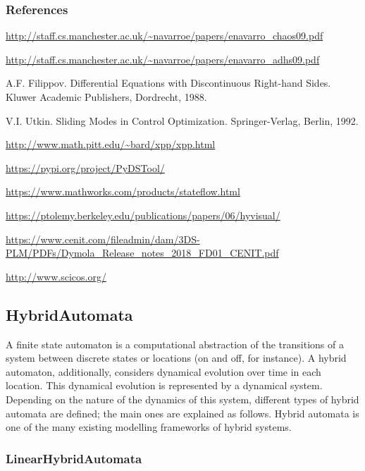 \subsubsection{References}

\url{http://staff.cs.manchester.ac.uk/~navarroe/papers/enavarro_chaos09.pdf}

\url{http://staff.cs.manchester.ac.uk/~navarroe/papers/enavarro_adhs09.pdf}

A.F. Filippov. Differential Equations with Discontinuous Right-hand Sides. Kluwer Academic Publishers, Dordrecht, 1988.

V.I. Utkin. Sliding Modes in Control Optimization. Springer-Verlag, Berlin, 1992.

\url{http://www.math.pitt.edu/~bard/xpp/xpp.html}

\url{https://pypi.org/project/PyDSTool/}

\url{https://www.mathworks.com/products/stateflow.html}

\url{https://ptolemy.berkeley.edu/publications/papers/06/hyvisual/}

\url{https://www.cenit.com/fileadmin/dam/3DS-PLM/PDFs/Dymola_Release_notes_2018_FD01_CENIT.pdf}

\url{http://www.scicos.org/}


\subsection{HybridAutomata}
\label{subsecF:HybridAutomata}

A finite state automaton is a computational abstraction of the transitions of a system between discrete states or locations (on and off, for instance). A hybrid automaton, additionally, considers dynamical evolution over time in each location. This dynamical evolution is represented by a dynamical system. Depending on the nature of the dynamics of this system, different types of hybrid automata are defined; the main ones are explained as follows. Hybrid automata is one of the many existing modelling frameworks of hybrid systems.


\subsubsection{LinearHybridAutomata}
\label{subsubsecF:LinearHybridAutomata}

